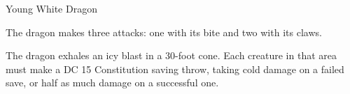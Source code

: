 \documentclass[10pt,twoside,openany,nodeprecatedcode]{dndbook}
\begin{document}
\begin{DndMonster}[width=\textwidth]{Young White Dragon}
\begin{multicols}{2}

            The dragon makes three attacks: one with its bite and two with its claws.


            \DndMonsterMelee[
                name = Bite,
                mod = +7,
                reach = 10,
                targets = one target,
                dmg = \DndDice{2d10 + 4},
                dmg-type = piercing,
                plus-dmg = \DndDice{1d8},
                plus-dmg-type = cold,
            ]

            \DndMonsterMelee[
                name = Claw,
                mod = +7,
                reach = 5,
                targets = one target,
                dmg = \DndDice{2d6 + 4},
                dmg-type = slashing,
            ]


            The dragon exhales an icy blast in a 30-foot cone. Each creature in that area must make a DC 15 Constitution saving throw, taking  cold damage on a failed save, or half as much damage on a successful one.

            
        \end{multicols}
    \end{DndMonster}
\end{document}
